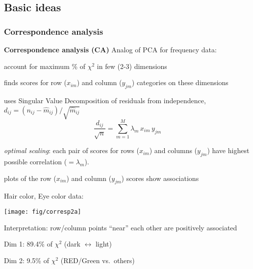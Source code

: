 \renewcommand{\FileName}{corresp}
\subsection{Basic ideas}
\begin{frame}[squeeze]
  \frametitle{Correspondence analysis}
  \begin{block}{\large\bfseries Correspondence analysis (CA)} 
     Analog of PCA for frequency data: 
      \begin{itemize*}
	  \item account for maximum \% of $\chi^2$ in few (2-3) dimensions
	  \item finds scores for row ($x_{im}$) and column ($y_{jm}$) categories on these dimensions
	  \item uses Singular Value Decomposition of residuals from independence,
	  $d_{ij} = (n_{ij} - \widehat{m}_{ij}) / \sqrt{\widehat{m}_{ij}}$
\begin{equation*}
  \frac{  d_{ij}} { \sqrt { n } }
 = \sum_{m=1}^M  \lambda_m \,  x_{im} \,  y_{jm}
\end{equation*}
	  \item \emph{optimal scaling}:  each pair of scores for rows ($x_{im}$) and columns ($y_{jm}$) have highest
	  possible correlation ($= \lambda_m$).
	  \item plots of the row ($x_{im}$) and column ($y_{jm}$) scores show associations
	  \end{itemize*}
  \end{block}
\end{frame}


\begin{frame}
Hair color, Eye color data:
 \begin{center}
  \texttt{[image: fig/corresp2a]}
  \begin{itemize*}
  \item Interpretation:  row/column points ``near'' each other are positively associated
  \item Dim 1: 89.4\% of $\chi^2$ (dark $\leftrightarrow$ light)
  \item Dim 2: 9.5\% of $\chi^2$ (RED/Green vs.\ others)
  \end{itemize*}
 \end{center}
\end{frame}

